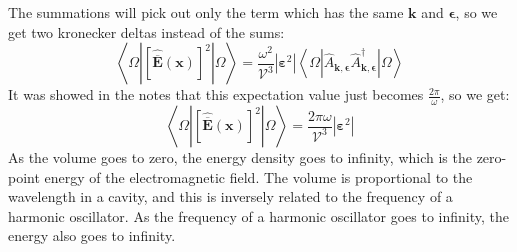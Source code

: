 \documentclass[12pt]{article}
\begin{document}
The summations will pick out only the term which has the same $\mathbf{k}$ and $\boldsymbol{\epsilon}$, so we get two kronecker deltas instead of the sums:
\begin{equation}
  \left\langle\Omega\left|[\hat{\overline{\mathbf{E}}}(\mathbf{x})]^{2}\right| \Omega\right\rangle = \frac{\omega ^2}{\mathcal{V}^{3}}|\boldsymbol{\varepsilon }^2|\left\langle\Omega\left|\hat{A}_{\mathbf{k}, \boldsymbol{\epsilon}} \hat{A}_{\mathbf{k}, \boldsymbol{\epsilon}}^{\dagger}\right| \Omega\right\rangle
\end{equation}
It was showed in the notes that this expectation value just becomes $\frac{2\pi}{\omega }$, so we get:
\begin{equation}
  \left\langle\Omega\left|[\hat{\overline{\mathbf{E}}}(\mathbf{x})]^{2}\right| \Omega\right\rangle = \frac{2\pi\omega }{\mathcal{V}^{3}}|\boldsymbol{\varepsilon }^2|
\end{equation}
As the volume goes to zero, the energy density goes to infinity, which is the zero-point energy of the electromagnetic field. The volume is proportional to the wavelength in a cavity, and this is inversely related to the frequency of a harmonic oscillator. As the frequency of a harmonic oscillator goes to infinity, the energy also goes to infinity.
 
\end{document}
